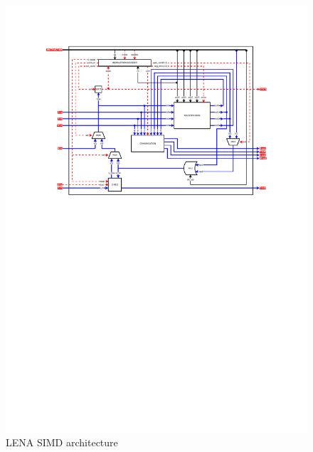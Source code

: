 \begin{figure}[h]
  \centering
 \includegraphics[width=\linewidth,clip,trim=0 0 0 0]
                  {fig/fpga/fpga-simd-arch.pdf}
  \caption{LENA SIMD architecture}
  \label{fig:fpga-simd-arch}
\end{figure}
